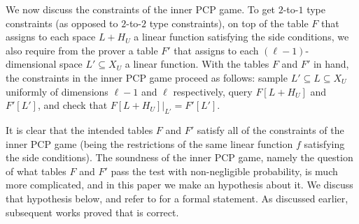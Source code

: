 \documentclass{toc}
\renewcommand\subset{\subseteq}
\begin{document}
We now discuss the constraints of the inner PCP game. To get $2$-to-$1$ type constraints (as opposed to $2$-to-$2$ type constraints), on top
of the table $F$ that assigns to each space $L+H_U$ a linear function satisfying the side conditions, we also require from the prover a table
$F'$ that assigns to each $(\ell-1)$-dimensional space $L'\subseteq X_U$ a linear function. With the tables $F$ and $F'$ in hand, the constraints
in the inner PCP game proceed as follows: sample $L'\subset L\subseteq X_U$ uniformly of dimensions $\ell-1$ and $\ell$ respectively, query
$F[L + H_U]$ and $F'[L']$, and check that $F[L+H_U]|_{L'} = F'[L']$.

It is clear that the intended tables $F$ and $F'$ satisfy all of the
constraints of the inner PCP game (being the restrictions of the same linear function $f$ satisfying the side conditions).
The soundness of the inner PCP game, namely the question of what tables $F$ and $F'$ pass the test with non-negligible probability,
is much more complicated, and in this paper we make an hypothesis about it. We discuss that hypothesis below, and refer to  for a formal statement. As discussed earlier, subsequent works proved that 
is correct.
\end{document}

